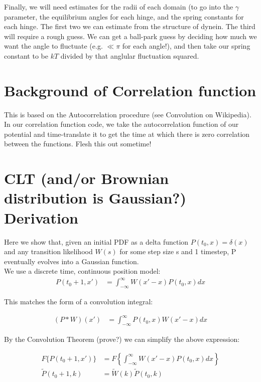 \documentclass[10pt]{article} %
\begin{document}
Finally, we will need estimates for the radii of each domain (to go
into the $\gamma$ parameter, the equilibrium angles for each hinge, and
the spring constants for each hinge.  The first two we can estimate
from the structure of dynein.  The third will require a rough guess.
We can get a ball-park guess by deciding how much we want the angle to
fluctuate (e.g. $\ll \pi$ for each angle!), and then take our spring
constant to be $kT$ divided by that anglular fluctuation squared.

\section{Background of Correlation function}
This is based on the Autocorrelation procedure (see Convolution on Wikipedia).
In our correlation function code, we take the autocorrelation function of our
potential and time-translate it to get the time at which there is zero correlation
between the functions. Flesh this out sometime!\\

\section{CLT (and/or Brownian distribution is Gaussian?) Derivation}
Here we show that, given an initial PDF as a delta function $P(t_0,x) = \delta(x)$
and any transition likelihood $W(s)$ for some step size s and 1 timestep, P
eventually evolves into a Gaussian function.\\

We use a discrete time, continuous position model:\\

\begin{align}
  P(t_0+1,x') &= \int_{-\infty}^{\infty}W(x'-x)P(t_0,x)dx
\end{align}

This matches the form of a convolution integral:

\begin{align*}
  (P*W)(x') &= \int_{-\infty}^{\infty}P(t_0,x)W(x'-x)dx
\end{align*}

By the Convolution Theorem (prove?) we can simplify the above expression:

\begin{align}
  F\{P(t_0+1,x')\} &= F\left\{\int_{-\infty}^{\infty}W(x'-x)P(t_0,x)dx\right\}\\
  \widetilde{P}(t_0+1,k) &= \widetilde{W}(k)\widetilde{P}(t_0,k)
\end{align}
\end{document}
